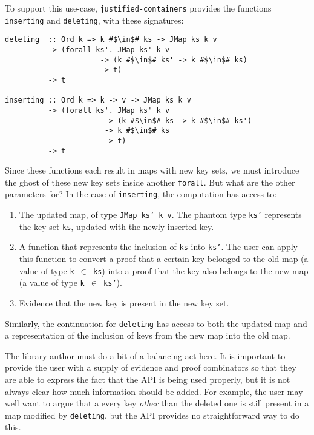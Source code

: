 \documentclass[format=sigplan, review=false, screen=true]{acmart}
\begin{document}
To support this use-case, \texttt{justified-containers} provides the functions
\texttt{inserting} and \texttt{deleting}, with these signatures:
\begin{verbatim}
deleting  :: Ord k => k #$\in$# ks -> JMap ks k v
          -> (forall ks'. JMap ks' k v
                      -> (k #$\in$# ks' -> k #$\in$# ks)
                      -> t)
          -> t

inserting :: Ord k => k -> v -> JMap ks k v
          -> (forall ks'. JMap ks' k v
                       -> (k #$\in$# ks -> k #$\in$# ks')
                       -> k #$\in$# ks
                       -> t)
          -> t
\end{verbatim}
Since these functions each result in maps with new key sets, we must
introduce the ghost of these new key sets inside another \texttt{forall}.
But what are the other parameters for? In the case of \texttt{inserting},
the computation has access to:
\begin{enumerate}
\item The updated map, of type \texttt{JMap ks' k v}. The phantom type \texttt{ks'}
  represents the key set \texttt{ks}, updated with the newly-inserted key.
\item A function that represents the inclusion of \texttt{ks} into \texttt{ks'}.
  The user can apply this function to convert a proof that a certain key belonged to the
  old map (a value of type \texttt{k $\in$ ks}) into a proof that the key also belongs to the new map (a value of type \texttt{k $\in$ ks'}).
\item Evidence that the new key is present in the new key set.
\end{enumerate}

Similarly, the continuation for \texttt{deleting} has access to both the updated map
and a representation of the inclusion of keys from the new map into the old map.

The library author must do a bit of a balancing act here. It is important to provide
the user with a supply of evidence and proof combinators so that they are able to
express the fact that the API is being used properly, but it is not always clear how
much information should be added. For example, the user may well want to argue that a
every key \emph{other} than the deleted one is still present in a map modified by
\texttt{deleting}, but the API provides no straightforward way to do this.
\end{document}
